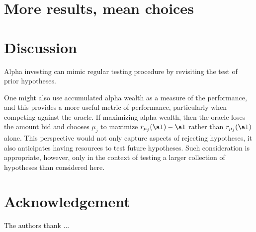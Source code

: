\documentclass[12pt]{article}
\begin{document}
\section{More results, mean choices}


\section{Discussion}

Alpha investing can mimic regular testing procedure by revisiting the test of
prior hypotheses. 

One might also use accumulated alpha wealth as a measure of the performance, and
 this provides a more useful metric of performance, particularly when competing
 against the oracle.  If maximizing alpha wealth, then the oracle loses the
 amount bid and chooses $\mu_j$ to maximize $r_{\mu_j}(\al)-\al$ rather than
 $r_{\mu_j}(\al)$ alone.  This perspective would not only capture aspects of
 rejecting hypotheses, it also anticipates having resources to test future
 hypotheses.  Such consideration is appropriate, however, only in the context of
 testing a larger collection of hypotheses than considered here.



\section*{Acknowledgement}

The authors thank ...





\end{document}
